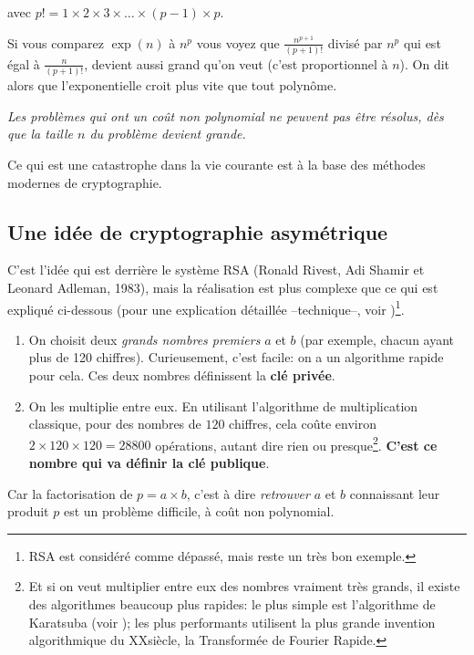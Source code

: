 avec $p! = 1\times 2\times 3\times \ldots \times (p-1)  \times p$.

Si vous comparez $\exp(n)$ à $n^p$ vous voyez que $
\frac{n^{p+1}}{(p+1)!}$ divisé par $n^p$ qui est égal à
$\frac{n}{(p+1)!}$, devient aussi grand qu'on
veut (c'est proportionnel à $n$). On dit alors que l'exponentielle
croit plus vite que tout polynôme.

\emph{Les problèmes qui ont un coût non polynomial ne peuvent pas être
  résolus, dès que la taille $n$ du problème devient grande.}

Ce qui est une catastrophe dans la vie courante est à la base des
méthodes modernes  de cryptographie.

\subsection{Une idée de cryptographie asymétrique} C'est l'idée qui
est derrière le système RSA (Ronald Rivest, Adi Shamir et Leonard
Adleman, 1983), mais la réalisation est plus complexe que ce qui est
expliqué ci-dessous (pour une explication détaillée --technique--,
voir \cite{rsa})\footnote{RSA est considéré comme dépassé, mais reste
  un très bon exemple.}.

\begin{enumerate}
  \item On choisit deux \emph{grands nombres premiers} $a$ et $b$ (par exemple,
    chacun ayant plus de 120 chiffres). Curieusement, c'est facile: on a un
    algorithme rapide pour cela. Ces deux nombres définissent la
    \textbf{clé privée}. 
  \item On les multiplie entre eux. En utilisant l'algorithme de
    multiplication classique, pour des nombres de $120$ chiffres, cela
    coûte environ $2 \times 120 \times 120 = 28800$ 
    opérations, autant dire rien ou presque\footnote{Et si on veut
      multiplier entre eux des nombres vraiment très grands, il existe
      des algorithmes beaucoup plus rapides: le plus simple est
      l'algorithme de Karatsuba (voir \cite{Karatsuba}); les plus
      performants utilisent la plus grande invention algorithmique du
      XX\ieme siècle, la Transformée de Fourier
      Rapide.}. \textbf{C'est ce nombre 
      qui va définir la clé publique}.
\end{enumerate}
    
Car la factorisation de $p = a \times b$, c'est à dire \emph{retrouver}
$a$ et $b$ connaissant leur produit $p$ est un problème difficile, à coût
non polynomial. 

